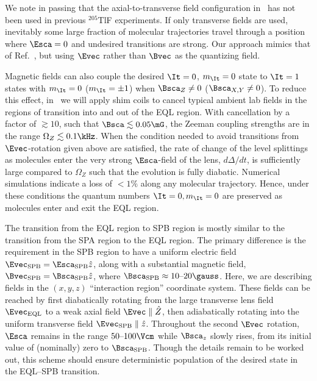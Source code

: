 We note in passing that the axial-to-transverse field configuration in \CENTREX\ has not been used in previous $^{205}$TlF experiments.  If only transverse fields are used, inevitably some large fraction of molecular trajectories travel through a position where $\Esca=0$ and undesired transitions are strong.  Our approach mimics that of Ref.~\cite{WoodWiemanParity1997}, but using $\Evec$ rather than $\Bvec$ as the quantizing field.

Magnetic fields can also couple the desired $\It=0$, $m_{\It} = 0$ state to $\It=1$ states with $m_{\It}=0$ ($m_{\It} = \pm 1$) when $\Bsca_Z \neq 0$ ($\Bsca_{X,Y} \neq 0$).  To reduce this effect, in \CENTREX\ we will apply shim coils to cancel typical ambient lab fields in the regions of transition into and out of the EQL region. With cancellation by a factor of $\gtrsim 10$, such that $\Bsca \lesssim 0.05\mG$, the Zeeman coupling strengths are in the range $\Omega_Z\lesssim 0.1\kHz$. When the condition needed to avoid transitions from $\Evec$-rotation given above are satisfied, the rate of change of the level splittings as molecules enter the very strong $\Esca$-field of the lens, $d\Delta/dt$, is sufficiently large compared to $\Omega_Z$ such that the evolution is fully diabatic. Numerical simulations indicate a loss of $<1\%$ along any molecular trajectory. Hence, under these conditions the quantum numbers $\It=0,m_{\It}=0$ are preserved as molecules enter and exit the EQL region.

The transition from the EQL region to SPB region is mostly similar to the transition from the SPA region to the EQL region. The primary difference is the requirement in the SPB region to have a uniform electric field $\Evec_{\rm SPB} = \Esca_{\rm SPB} \hat{z}$, along with a substantial magnetic field, $\Bvec_{\rm SPB} = \Bsca_{\rm SPB}\hat{z}$, where $\Bsca_{\rm SPB} \approx \hbox{10--20}\gauss$. Here, we are describing fields in the $(x,y,z)$ ``interaction region'' coordinate system. These fields can be reached by first diabatically rotating from the large transverse lens field $\Evec_{\rm EQL}$ to a weak axial field $\Evec \parallel \hat{Z}$, then adiabatically rotating into the uniform transverse field $\Evec_{\rm SPB} \parallel \hat{z}$. Throughout the second $\Evec$ rotation, $\Esca$ remains in the range $\hbox{50--100} \Vcm$ while $\Bsca_z$ slowly rises, from its initial value of (nominally) zero to $\Bsca_{\rm SPB}$. Though the details remain to be worked out, this scheme should ensure deterministic population of the desired state in the EQL--SPB transition.

